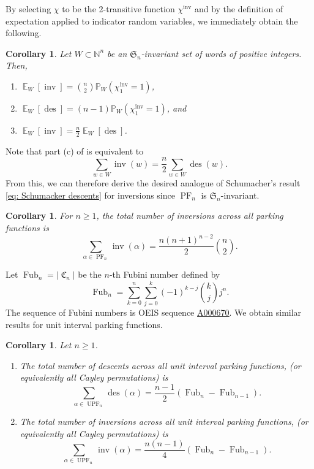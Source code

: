 \documentclass{amsart}
\newcommand{\seqnum}[1]{\href{http://oeis.org/#1}{\underline{#1}}}
\newcommand{\N}{\mathbb{N}}
\renewcommand{\P}{\mathbb{P}}
\renewcommand{\S}{\mathfrak{S}}
\DeclareMathOperator{\des}{des}
\DeclareMathOperator{\inv}{inv}
\DeclareMathOperator{\PF}{PF}
\DeclareMathOperator{\UPF}{UPF} %
\DeclareMathOperator{\Fub}{Fub}
\DeclareMathOperator{\E}{\mathbb{E}}
\DeclareMathOperator{\C}{\mathfrak{C}}
\newtheorem{corollary}[theorem]{Corollary}
\theoremstyle{definition}
\begin{document}
By selecting $\chi$ to be the 2-transitive function $\chi^{\inv}$ and by the definition of expectation applied to indicator random variables, we immediately obtain the following. 

\begin{corollary}\label{thm:inv-and-des-sums-for-words}
    Let $W\subset \N^{n}$ be an $\S_n$-invariant set of words of positive integers. 
    Then,
    \begin{enumerate}[label=(\alph*)]
        \item $\E_{W}\left[\inv\right]=\binom{n}{2}\mathbb{P}_{W}\left(\chi^{\inv}_1=1\right)$,
        \item $\E_{W}\left[\des\right]=(n-1)\P_{W}\left(\chi^{\inv}_1=1\right)$, and
        \item $\E_{W}\left[\inv\right]=\frac{n}{2}\E_{W}\left[\des\right]$.
    \end{enumerate}
\end{corollary}
Note that part (c) of  is equivalent to  \begin{equation}\sum_{w\in W}\inv(w)=\frac{n}{2}\sum_{w\in W}\des(w).\end{equation}
From this, we can therefore derive the desired analogue of Schumacher's result \eqref{eq: Schumacker descents} for inversions since $\PF_n$ is $\S_n$-invariant.
\begin{corollary}\label{thm:total-number-of-inversions-in-parking-functions}
    For $n\geq 1$, the total number of inversions across all parking functions is
    \[\sum_{\alpha\in \PF_n}\inv(\alpha)=\frac{n(n+1)^{n-2}}{2}\binom{n}{2}.\]
\end{corollary}
Let $\Fub_n=|\C_n|$ be the $n$-th Fubini number defined by
\[\Fub_n=\sum _{{k=0}}^{n}\sum _{{j=0}}^{k}(-1)^{{k-j}}{\binom  {k}{j}}j^{n}.\]
The sequence of Fubini numbers is OEIS sequence \seqnum{A000670}. We obtain similar results for unit interval parking functions.
\begin{corollary}\label{thm:total-num-descent-in-cayley-permutations}
    Let $n\geq 1$.
    \begin{enumerate}
    \item The total number of descents across all unit interval parking functions, (or equivalently all Cayley permutations) is 
    \[\sum_{\alpha\in \UPF_n}\des(\alpha)=\frac{n-1}{2}(\Fub_n-\Fub_{n-1}). \]
   \item The total number of inversions across all unit interval parking functions, (or equivalently all Cayley permutations) is
   \[\sum_{\alpha\in \UPF_n}\inv(\alpha)=\frac{n(n-1)}{4}(\Fub_n-\Fub_{n-1}). \]
   \end{enumerate}
\end{corollary}
\end{document}
